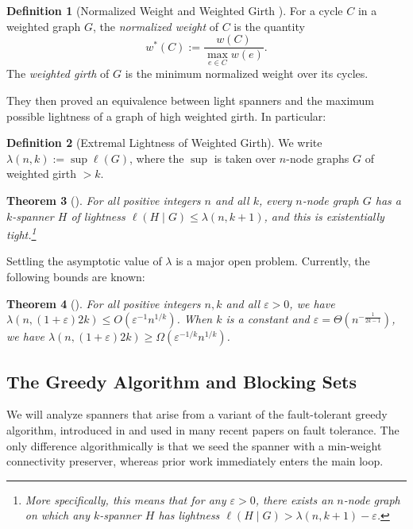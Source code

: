 \documentclass{article}
\theoremstyle{plain}
\newtheorem{theorem}{Theorem}
\theoremstyle{definition}
\newtheorem{definition}[theorem]{Definition}
\newcommand{\eps}{\varepsilon}
\begin{document}
\begin{definition} [Normalized Weight and Weighted Girth \cite{ENS14}]
For a cycle $C$ in a weighted graph $G$, the \emph{normalized weight} of $C$ is the quantity
$$w^*(C) := \frac{w(C)}{\max_{e \in C} w(e)}.$$
The \emph{weighted girth} of $G$ is the minimum normalized weight over its cycles.
\end{definition}

They then proved an equivalence between light spanners and the maximum possible lightness of a graph of high weighted girth.
In particular:
\begin{definition} [Extremal Lightness of Weighted Girth]
We write $\lambda(n, k) := \sup \ell(G)$, 
where the $\sup$ is taken over $n$-node graphs $G$ of weighted girth $>k$.
\end{definition}

\begin{theorem} [\cite{ENS14}] \label{thm:ENS}
For all positive integers $n$ and all $k$, every $n$-node graph $G$ has a $k$-spanner $H$ of lightness
$\ell(H \mid G) \le \lambda(n, k+1)$,
and this is existentially tight.\footnote{More specifically, this means that for any $\eps > 0$, there exists an $n$-node graph on which any $k$-spanner $H$ has lightness $\ell(H \mid G) > \lambda(n, k+1) - \eps$.}
\end{theorem}

Settling the asymptotic value of $\lambda$ is a major open problem.
Currently, the following bounds are known:

\begin{theorem} [\cite{LS23, Bodwin25, BF25}] \label{thm:priorlight}
For all positive integers $n, k$ and all $\eps > 0$, we have
$\lambda(n, (1+\eps)2k) \le O\left(\eps^{-1} n^{1/k} \right)$.  When $k$ is a constant and $\eps = \Theta(n^{-\frac{1}{2k-1}})$, we have
$\lambda(n, (1+\eps)2k) \ge \Omega\left(\eps^{-1/k} n^{1/k} \right)$.
\end{theorem}

\subsection{The Greedy Algorithm and Blocking Sets}

We will analyze spanners that arise from a variant of the fault-tolerant greedy algorithm, introduced in \cite{BDPV18} and used in many recent papers on fault tolerance.
The only difference algorithmically is that we seed the spanner with a min-weight connectivity preserver, whereas prior work immediately enters the main loop.
\end{document}
